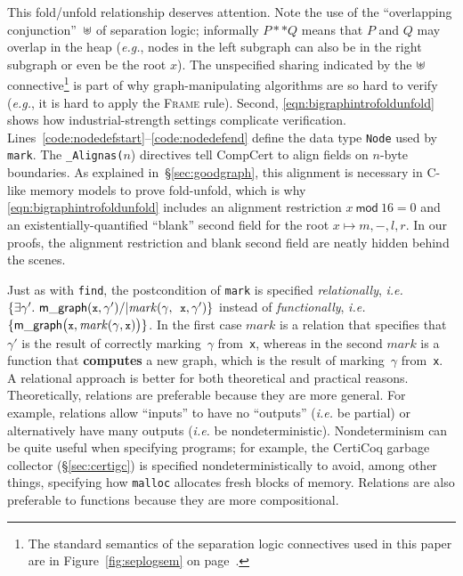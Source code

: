 \documentclass[acmsmall,screen]{acmart}
\newcommand{\li}[1]{{\texttt{\small #1}}}
\newcommand{\scon}{\mathbin{\star}}
\renewcommand{\scon}{\mathbin{\ast}} \renewcommand{\bigstar}{\raisebox{-0.24em}{{\scaleobj{2.5}{\scon}}}}
\newcommand{\ocon}{
  \mathbin{\mbox{$\mathrlap{\cup}\hspace*{.09em}
      \raisebox{.04em}[0ex][0ex]{$\scon$}$\hspace*{.07em}}}}
\newcommand{\p}[1]{\ensuremath{\mathsf{#1}}} \newcommand{\m}[1]{\ensuremath{\mathit{#1}}} \newcommand{\ma}[1]{\ensuremath{\mathcal{#1}}} \let\ramify\lightning
\newcommand{\infrulestyle}[1]{\textsc{#1}}
\begin{document}
This fold/unfold relationship deserves attention.
Note the use of the ``overlapping conjunction''~$\ocon$ of separation logic; informally $P ** Q$ means that $P$ and $Q$ may overlap
in the heap (\emph{e.g.}, nodes in the left subgraph can also be in the right subgraph
or even be the root $x$).  The unspecified sharing indicated by the
$\ocon$ connective\footnote{The
standard semantics of the separation logic connectives used in this paper are in
Figure~\ref{fig:seplogsem} on page~\pageref{fig:seplogsem}.} is part of why graph-manipulating algorithms are so hard to verify
(\emph{e.g.}, it is hard to apply the \infrulestyle{Frame} rule).
Second, \eqref{eqn:bigraphintrofoldunfold} shows how industrial-strength settings complicate verification.  Lines~\mbox{\ref{code:nodedefstart}--\ref{code:nodedefend}} define the data type \li{Node} used by \li{mark}.  The \li{\_Alignas(}$n${)} directives tell CompCert to align fields on $n$-byte boundaries.
As explained in~\S\ref{sec:goodgraph}, this alignment is necessary in C-like memory models to prove fold-unfold, which is why \eqref{eqn:bigraphintrofoldunfold} includes an alignment restriction $x~\mathsf{mod}~16 = 0$ and an existentially-quantified ``blank'' second field for the root $x \mapsto m,-,l,r$.
In our proofs, the alignment restriction and blank second field are neatly
hidden behind the scenes.

Just as with \li{find}, the postcondition of \li{mark} is specified \emph{relationally}, \emph{i.e.} $\{\exists \gamma'.~ \p{m\_graph}(\li{x},\gamma') /| \m{mark}(\gamma, \li{x}, \gamma')\}$ instead of \emph{functionally}, \emph{i.e.} $\{\p{m\_graph}\big(\li{x},\m{mark}(\gamma, \li{x})\big)\}$. In the first case $\m{mark}$ is a relation that specifies that~$\gamma'$ is the result of correctly marking~$\gamma$ from~\li{x}, whereas in the second $\m{mark}$ is a function that \textbf{computes} a new graph, which is the result of marking~$\gamma$ from~\li{x}. A relational approach is better for both theoretical and practical reasons.
Theoretically, relations are preferable because they are more general.  For example, relations allow ``inputs'' to have no ``outputs'' (\emph{i.e.} be partial) or alternatively have many outputs (\emph{i.e.} be nondeterministic).  Nondeterminism can be quite useful when specifying programs; for example, the CertiCoq garbage collector (\S\ref{sec:certigc}) is specified nondeterministically to avoid, among other things, specifying how \li{malloc} allocates fresh blocks of memory.  Relations are also preferable to functions because they are more compositional.
\end{document}
